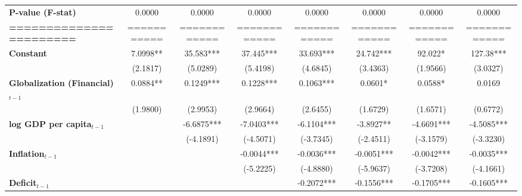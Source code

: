 \begin{center}
\begin{tabular}{lccccccc}
\textbf{P-value (F-stat)}          &       0.0000      &        0.0000        &           0.0000          &       0.0000       &      0.0000     &           0.0000          &            0.0000             \\
\textbf{=======================}   &    ===========    &     ============     &        ============       &    ============    &   ============  &        ============       &         ============          \\
\textbf{Constant}                     &      7.0998**     &      35.583***       &         37.445***         &     33.693***      &    24.742***    &          92.022*          &          127.38***            \\
\textbf{ }                         &      (2.1817)     &       (5.0289)       &          (5.4198)         &      (4.6845)      &     (3.4363)    &          (1.9566)         &           (3.0327)            \\
\textbf{Globalization (Financial)$_{t-1}$}             &      0.0884**     &      0.1249***       &         0.1228***         &     0.1063***      &     0.0601*     &          0.0588*          &            0.0169             \\
\textbf{ }                         &      (1.9800)     &       (2.9953)       &          (2.9664)         &      (2.6455)      &     (1.6729)    &          (1.6571)         &           (0.6772)            \\
\textbf{log GDP per capita$_{t-1}$}           &                   &      -6.6875***      &         -7.0403***        &     -6.1104***     &    -3.8927**    &         -4.6691***        &          -4.5085***           \\
\textbf{ }                         &                   &      (-4.1891)       &         (-4.5071)         &     (-3.7345)      &    (-2.4511)    &         (-3.1579)         &          (-3.3230)            \\
\textbf{Inflation$_{t-1}$}      &                   &                      &         -0.0044***        &     -0.0036***     &    -0.0051***   &         -0.0042***        &          -0.0035***           \\
\textbf{ }                         &                   &                      &         (-5.2225)         &     (-4.8880)      &    (-5.9637)    &         (-3.7208)         &          (-4.1661)            \\
\textbf{Deficit$_{t-1}$}             &                   &                      &                           &     -0.2072***     &    -0.1556***   &         -0.1705***        &          -0.1605***           \\

\end{tabular}
\end{center}
